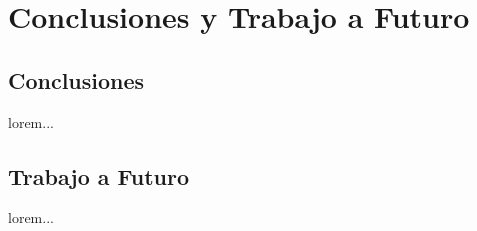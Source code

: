 
\chapter{Conclusiones y Trabajo a Futuro}

  \section{Conclusiones}

lorem...

  \section{Trabajo a Futuro}

lorem...

